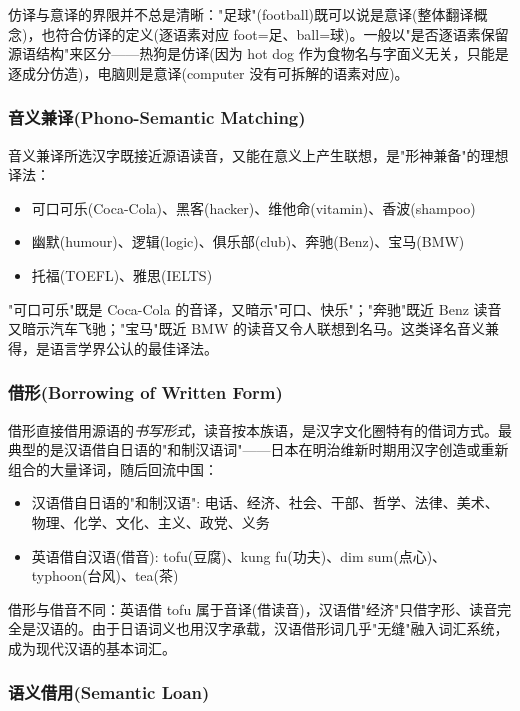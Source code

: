 仿译与意译的界限并不总是清晰："足球"(football)既可以说是意译(整体翻译概念)，也符合仿译的定义(逐语素对应 foot=足、ball=球)。一般以"是否逐语素保留源语结构"来区分——热狗是仿译(因为 hot dog 作为食物名与字面义无关，只能是逐成分仿造)，电脑则是意译(computer 没有可拆解的语素对应)。

\subsubsection{音义兼译(Phono-Semantic Matching)}

音义兼译所选汉字既接近源语读音，又能在意义上产生联想，是"形神兼备"的理想译法：
\begin{itemize}
    \item 可口可乐(Coca-Cola)、黑客(hacker)、维他命(vitamin)、香波(shampoo)
    \item 幽默(humour)、逻辑(logic)、俱乐部(club)、奔驰(Benz)、宝马(BMW)
    \item 托福(TOEFL)、雅思(IELTS)
\end{itemize}

"可口可乐"既是 Coca-Cola 的音译，又暗示"可口、快乐"；"奔驰"既近 Benz 读音又暗示汽车飞驰；"宝马"既近 BMW 的读音又令人联想到名马。这类译名音义兼得，是语言学界公认的最佳译法。

\subsubsection{借形(Borrowing of Written Form)}

借形直接借用源语的\emph{书写形式}，读音按本族语，是汉字文化圈特有的借词方式。最典型的是汉语借自日语的"和制汉语词"——日本在明治维新时期用汉字创造或重新组合的大量译词，随后回流中国：
\begin{itemize}
    \item 汉语借自日语的"和制汉语": 电话、经济、社会、干部、哲学、法律、美术、物理、化学、文化、主义、政党、义务
    \item 英语借自汉语(借音): tofu(豆腐)、kung fu(功夫)、dim sum(点心)、typhoon(台风)、tea(茶)
\end{itemize}

借形与借音不同：英语借 tofu 属于音译(借读音)，汉语借"经济"只借字形、读音完全是汉语的。由于日语词义也用汉字承载，汉语借形词几乎"无缝"融入词汇系统，成为现代汉语的基本词汇。

\subsubsection{语义借用(Semantic Loan)}

